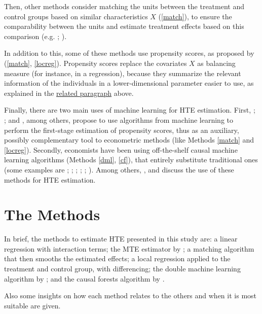 \documentclass[12pt,a4paper,openright,twoside]{book}
\newcommand{\customref}[2]{\hyperref[#1]{#2}}
\begin{document}
\begin{doublespacing}
Then, other methods consider matching the units between the treatment and control groups based on similar characteristics $X$ (\ref{match}), to ensure the comparability between the units and estimate treatment effects based on this comparison (e.g. \citealp{abadieimbens2016}; \citealp{xie2012estimating}). 

In addition to this, some of these methods use propensity scores, as proposed by \citet{xie2012estimating} (\ref{match}, \ref{locreg}). Propensity scores replace the covariates $X$ as balancing measure (for instance, in a regression), because they summarize the relevant information of the individuals in a lower-dimensional parameter easier to use, as explained in the \customref{ps}{related paragraph} above.
 

Finally, there are two main uses of machine learning for HTE estimation. First, \citet{cannas2019comparison}; \citet{goller2020does}; \citet{lee2010improving} and \citet{mccaffrey2004propensity}, among others, propose to use algorithms from machine learning to perform the first-stage estimation of propensity scores, thus as an auxiliary, possibly complementary tool to econometric methods (like Methods \ref{match} and \ref{locreg}). Secondly, economists have been using off-the-shelf causal machine learning algorithms (Methods \ref{dml}, \ref{cf}), that entirely substitute traditional ones (some examples are \citealp{atheyimbens2015}; \citealp{atheyimbens2016}; \citealp{wagerathey2018}; \citealp{atheytibishirani}; \citealp{chernozhukov2018double}; \citealp{rulensem}).
Among others, \citet{athey2019}, \citet{huber2023causal} and \citet{lechner2023} discuss the use of these methods for HTE estimation.  

\section{The Methods} \label{meth}

In brief, the methods to estimate HTE presented in this study are: a linear regression with interaction terms; the MTE estimator by \citet{heckman2005structural}; a matching algorithm that then smooths the estimated effects; a local regression applied to the treatment and control group, with differencing; the double machine learning algorithm by \citet{chernozhukov2018double}; and the causal forests algorithm by \citet{wagerathey2018}. 

Also some insights on how each method relates to the others and when it is most suitable are given. 


\end{doublespacing}
\end{document}
